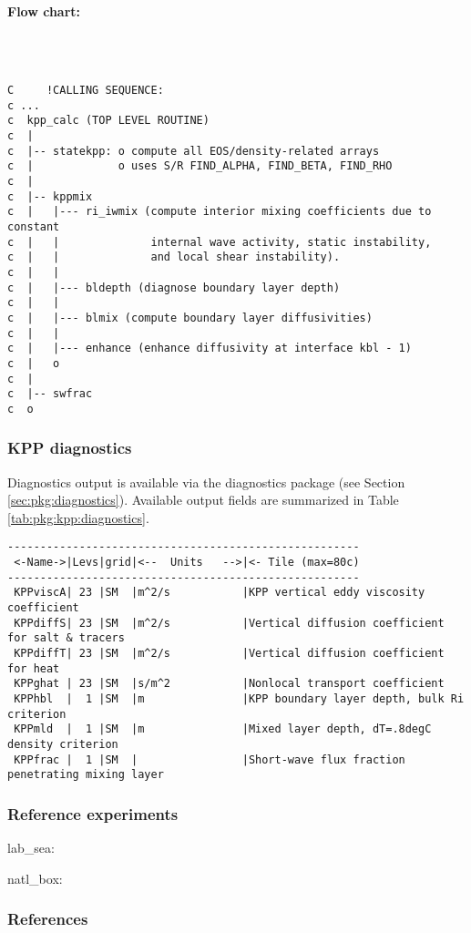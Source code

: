 \paragraph{Flow chart:} ~ \\
%
{\footnotesize
\begin{verbatim}

C     !CALLING SEQUENCE:
c ...
c  kpp_calc (TOP LEVEL ROUTINE)
c  |
c  |-- statekpp: o compute all EOS/density-related arrays
c  |             o uses S/R FIND_ALPHA, FIND_BETA, FIND_RHO
c  |
c  |-- kppmix
c  |   |--- ri_iwmix (compute interior mixing coefficients due to constant
c  |   |              internal wave activity, static instability, 
c  |   |              and local shear instability).
c  |   |
c  |   |--- bldepth (diagnose boundary layer depth)
c  |   |
c  |   |--- blmix (compute boundary layer diffusivities)
c  |   |
c  |   |--- enhance (enhance diffusivity at interface kbl - 1)
c  |   o
c  |
c  |-- swfrac
c  o

\end{verbatim}
}


\subsubsection{KPP diagnostics
\label{sec:pkg:kpp:diagnostics}}

Diagnostics output is available via the diagnostics package
(see Section \ref{sec:pkg:diagnostics}).
Available output fields are summarized in 
Table \ref{tab:pkg:kpp:diagnostics}.

\begin{table}[h!]
\centering
\label{tab:pkg:kpp:diagnostics}
{\footnotesize
\begin{verbatim}
------------------------------------------------------
 <-Name->|Levs|grid|<--  Units   -->|<- Tile (max=80c)
------------------------------------------------------
 KPPviscA| 23 |SM  |m^2/s           |KPP vertical eddy viscosity coefficient
 KPPdiffS| 23 |SM  |m^2/s           |Vertical diffusion coefficient for salt & tracers
 KPPdiffT| 23 |SM  |m^2/s           |Vertical diffusion coefficient for heat
 KPPghat | 23 |SM  |s/m^2           |Nonlocal transport coefficient
 KPPhbl  |  1 |SM  |m               |KPP boundary layer depth, bulk Ri criterion
 KPPmld  |  1 |SM  |m               |Mixed layer depth, dT=.8degC density criterion
 KPPfrac |  1 |SM  |                |Short-wave flux fraction penetrating mixing layer
\end{verbatim}
}
\caption{~}
\end{table}


\subsubsection{Reference experiments}

lab\_sea:

natl\_box:


\subsubsection{References}


